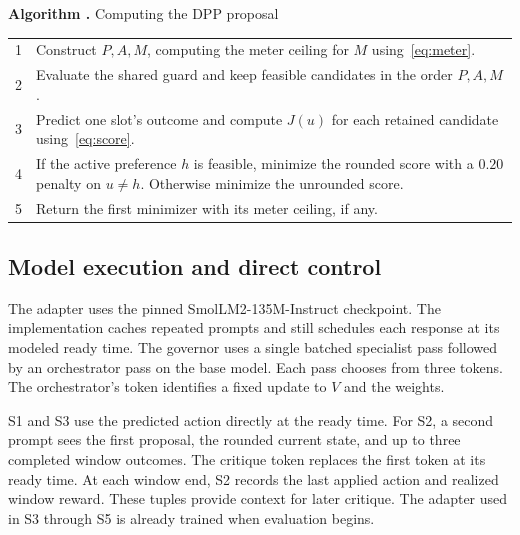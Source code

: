 \begin{table}[t]
\label{alg:action}
\noindent\textbf{Algorithm \theselfxalgorithm.} Computing the DPP proposal\par\smallskip
\small
\begin{tabular}{@{}r@{\quad}p{}@{}}
\toprule
1 & Construct \(P,A,M\), computing the meter ceiling for \(M\) using~\eqref{eq:meter}.\\
2 & Evaluate the shared guard and keep feasible candidates in the order \(P,A,M\).\\
3 & Predict one slot's outcome and compute \(J(u)\) for each retained candidate using~\eqref{eq:score}.\\
4 & If the active preference \(h\) is feasible, minimize the rounded score with a \(0.20\) penalty on \(u\ne h\). Otherwise minimize the unrounded score.\\
5 & Return the first minimizer with its meter ceiling, if any.\\
\bottomrule
\end{tabular}
\end{table}

\subsection{Model execution and direct control}
The adapter uses the pinned SmolLM2-135M-Instruct checkpoint. The implementation caches repeated prompts and still schedules each response at its modeled ready time. The governor uses a single batched specialist pass followed by an orchestrator pass on the base model. Each pass chooses from three tokens. The orchestrator's token identifies a fixed update to \(V\) and the weights.

S1 and S3 use the predicted action directly at the ready time. For S2, a second prompt sees the first proposal, the rounded current state, and up to three completed window outcomes. The critique token replaces the first token at its ready time. At each window end, S2 records the last applied action and realized window reward. These tuples provide context for later critique. The adapter used in S3 through S5 is already trained when evaluation begins.
